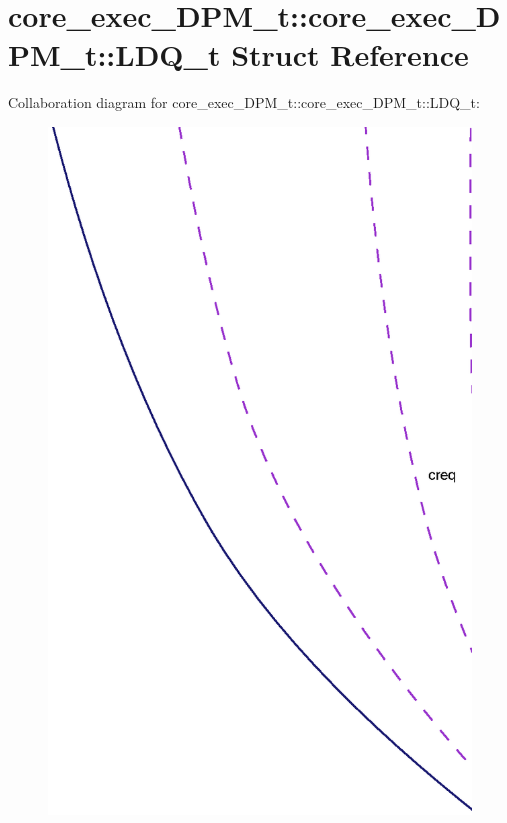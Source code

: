 \section{core\_\-exec\_\-DPM\_\-t::core\_\-exec\_\-DPM\_\-t::LDQ\_\-t Struct Reference}
\label{structcore__exec__DPM__t_1_1LDQ__t}
Collaboration diagram for core\_\-exec\_\-DPM\_\-t::core\_\-exec\_\-DPM\_\-t::LDQ\_\-t:\nopagebreak
\begin{figure}[H]
\begin{center}
\leavevmode
\includegraphics[width=400pt]{structcore__exec__DPM__t_1_1LDQ__t__coll__graph}
\end{center}
\end{figure}
